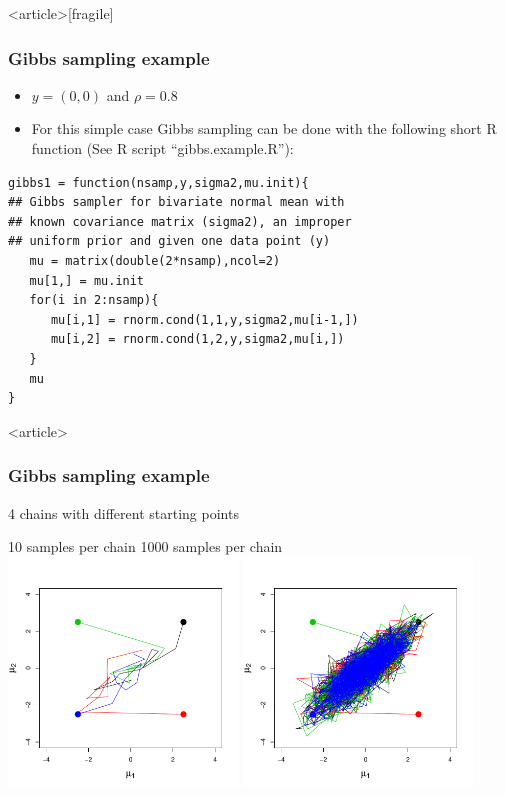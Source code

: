 \documentclass{beamer}
\begin{document}
\begin{frame}<article>[fragile]
  \frametitle{Gibbs sampling example}

\begin{itemize}  
\item $y = (0, 0)$ and $\rho = 0.8$
\item For this simple case Gibbs sampling can be done with the following short R function (See R script “gibbs.example.R”):
\end{itemize}
\begin{lstlisting}[frame=single]
gibbs1 = function(nsamp,y,sigma2,mu.init){
## Gibbs sampler for bivariate normal mean with
## known covariance matrix (sigma2), an improper
## uniform prior and given one data point (y)
   mu = matrix(double(2*nsamp),ncol=2)
   mu[1,] = mu.init
   for(i in 2:nsamp){
      mu[i,1] = rnorm.cond(1,1,y,sigma2,mu[i-1,])
      mu[i,2] = rnorm.cond(1,2,y,sigma2,mu[i,])
   }
   mu
}
\end{lstlisting}

\end{frame}

\begin{frame}<article>
  \frametitle{Gibbs sampling example}
  
4 chains with different starting points

\vspace{0.5in}
\hspace{0.35in} 10 samples per chain \hspace{0.9in} 1000 samples per chain \\
\vspace{-0.5in}
\includegraphics[width=2.4in]{graphics/gibbsSamplingExample001.pdf}
\includegraphics[width=2.4in]{graphics/gibbsSamplingExample002.pdf}

\end{frame}
\end{document}
